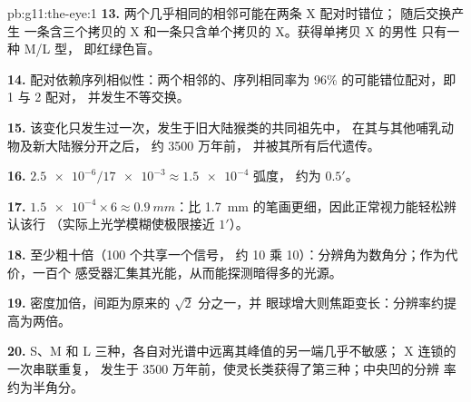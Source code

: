 \begin{solution}{pb:g11:the-eye:1}
\textbf{13.} 两个几乎相同的相邻可能在两条 X 配对时错位；
随后交换产生
一条含三个拷贝的 X 和一条只含单个拷贝的 X。获得单拷贝 X 的男性
只有一种 M/L 型，
即红绿色盲。

\textbf{14.} 配对依赖序列相似性：两个相邻的、序列相同率为 96\%
的可能错位配对，即 1 与 2 配对，
并发生不等交换。

\textbf{15.} 该变化只发生过一次，发生于旧大陆猴类的共同祖先中，
在其与其他哺乳动物及新大陆猴分开之后，
约 3500 万年前，
并被其所有后代遗传。

\textbf{16.} $\num{2.5e-6}/\num{17e-3} \approx \num{1.5e-4}$ 弧度，
约为 $0.5'$。

\textbf{17.} $\num{1.5e-4} \times 6 \approx \qty{0.9}{mm}$：比
\qty{1.7}{mm} 的笔画更细，因此正常视力能轻松辨认该行
（实际上光学模糊使极限接近
$1'$）。

\textbf{18.} 至少粗十倍（100 个共享一个信号，
约 10 乘 10）：分辨角为数角分；作为代价，一百个
感受器汇集其光能，从而能探测暗得多的光源。

\textbf{19.} 密度加倍，间距为原来的 $\sqrt{2}$ 分之一，并
眼球增大则焦距变长：分辨率约提高为两倍。

\textbf{20.} S、M 和 L 三种，各自对光谱中远离其峰值的另一端几乎不敏感；
X 连锁的一次串联重复，
发生于 3500 万年前，使灵长类获得了第三种；中央凹的分辨
率约为半角分。
\end{solution}
